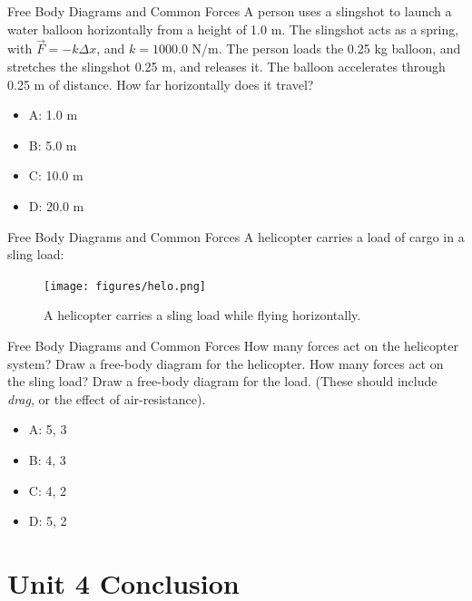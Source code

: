 \documentclass{beamer}
\begin{document}
\begin{frame}{Free Body Diagrams and Common Forces}
A person uses a slingshot to launch a water balloon horizontally from a height of 1.0 m.  The slingshot acts as a spring, with $\vec{F} = -k\Delta x$, and $k=1000.0$ N/m.  The person loads the 0.25 kg balloon, and stretches the slingshot 0.25 m, and releases it.  The balloon accelerates through 0.25 m of distance.  How far horizontally does it travel? 
\begin{itemize}
\item A: 1.0 m
\item B: 5.0 m
\item C: 10.0 m
\item D: 20.0 m
\end{itemize}
\end{frame}

\begin{frame}{Free Body Diagrams and Common Forces}
A helicopter carries a load of cargo in a sling load: \\
\begin{figure}
\centering
\texttt{[image: figures/helo.png]}
\caption{\label{fig:helo} A helicopter carries a sling load while flying horizontally.}
\end{figure}
\end{frame}

\begin{frame}{Free Body Diagrams and Common Forces}
How many forces act on the helicopter system?  Draw a free-body diagram for the helicopter.  How many forces act on the sling load?  Draw a free-body diagram for the load.  (These should include \textit{drag}, or the effect of air-resistance).
\begin{itemize}
\item A: 5, 3
\item B: 4, 3
\item C: 4, 2
\item D: 5, 2
\end{itemize}
\end{frame}

\section{Unit 4 Conclusion}
\end{document}
